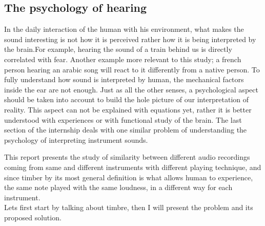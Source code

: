 \documentclass[hidelinks,12pt]{report}
\begin{document}
\subsection{The psychology of hearing}

In the daily interaction of the human with his environment, what makes the sound interesting is not how it is perceived rather how it is being interpreted by the brain.For example, hearing the sound of a train behind us is directly correlated with fear. Another example more relevant to this study; a french person hearing an arabic song will react to it differently from a native person. To fully understand how sound is interpreted by human, the mechanical factors inside the ear are not enough. Just as all the other senses, a psychological aspect should be taken into account to build the hole picture of our interpretation of reality. This aspect can not be explained with equations yet, rather it is better understood with experiences or with functional study of the brain. The last section of the internship deals with one similar problem of understanding the psychology of interpreting instrument sounds.\par 


This report presents the study of similarity between different audio recordings coming from same and different instruments with different playing technique, and since timber by its most general definition is what allows human to experience, the same note played with the same loudness, in a different way for each instrument.\\ Lets first start by talking about  timbre, then I will present the problem and its proposed solution. 
\end{document}
